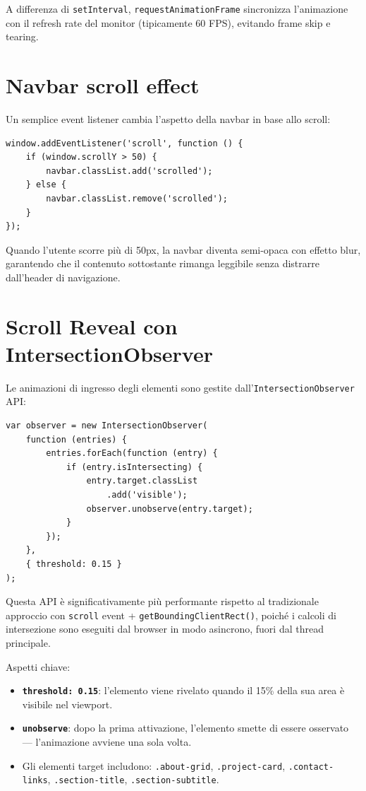 \documentclass[a4paper,12pt]{report}
\begin{document}
A differenza di \texttt{setInterval}, \texttt{requestAnimationFrame} sincronizza l'animazione con il refresh rate del monitor (tipicamente 60 FPS), evitando frame skip e tearing.

\section{Navbar scroll effect}

Un semplice event listener cambia l'aspetto della navbar in base allo scroll:

\begin{lstlisting}[style=jsstyle, caption={Effetto scroll navbar}]
window.addEventListener('scroll', function () {
    if (window.scrollY > 50) {
        navbar.classList.add('scrolled');
    } else {
        navbar.classList.remove('scrolled');
    }
});
\end{lstlisting}

Quando l'utente scorre pi\`u di 50px, la navbar diventa semi-opaca con effetto blur, garantendo che il contenuto sottostante rimanga leggibile senza distrarre dall'header di navigazione.

\section{Scroll Reveal con IntersectionObserver}

Le animazioni di ingresso degli elementi sono gestite dall'\texttt{IntersectionObserver} API:

\begin{lstlisting}[style=jsstyle, caption={IntersectionObserver per scroll reveal}]
var observer = new IntersectionObserver(
    function (entries) {
        entries.forEach(function (entry) {
            if (entry.isIntersecting) {
                entry.target.classList
                    .add('visible');
                observer.unobserve(entry.target);
            }
        });
    },
    { threshold: 0.15 }
);
\end{lstlisting}

Questa API \`e significativamente pi\`u performante rispetto al tradizionale approccio con \texttt{scroll} event + \texttt{getBoundingClientRect()}, poich\'e i calcoli di intersezione sono eseguiti dal browser in modo asincrono, fuori dal thread principale.

Aspetti chiave:
\begin{itemize}[leftmargin=2cm]
    \item \textbf{\texttt{threshold: 0.15}}: l'elemento viene rivelato quando il 15\% della sua area \`e visibile nel viewport.
    \item \textbf{\texttt{unobserve}}: dopo la prima attivazione, l'elemento smette di essere osservato --- l'animazione avviene una sola volta.
    \item Gli elementi target includono: \texttt{.about-grid}, \texttt{.project-card}, \texttt{.contact-links}, \texttt{.section-title}, \texttt{.section-subtitle}.
\end{itemize}
\end{document}
